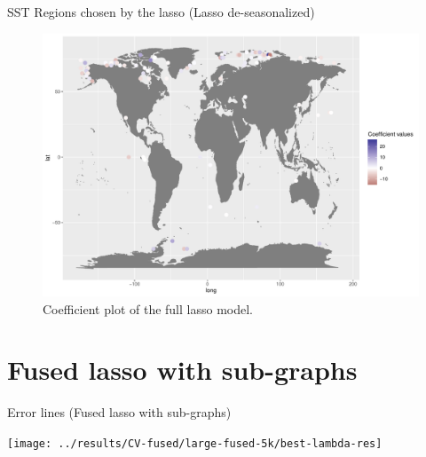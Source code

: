 \documentclass[
  ignorenonframetext,
]{beamer}
\begin{document}
\begin{frame}{SST Regions chosen by the lasso (Lasso de-seasonalized)}
\protect\hypertarget{sst-regions-chosen-by-the-lasso-lasso-de-seasonalized}{}
\begin{figure}

{\centering \includegraphics[width=0.75\linewidth]{ma-presentation_files/figure-beamer/coef-plot-full-lasso-des-1} 

}

\caption{Coefficient plot of the full lasso model.}\label{fig:coef-plot-full-lasso-des}
\end{figure}
\end{frame}

\hypertarget{fused-lasso-with-sub-graphs}{%
\section{Fused lasso with
sub-graphs}\label{fused-lasso-with-sub-graphs}}

\begin{frame}{Error lines (Fused lasso with sub-graphs)}
\protect\hypertarget{error-lines-fused-lasso-with-sub-graphs}{}
\begin{center}\texttt{[image: ../results/CV-fused/large-fused-5k/best-lambda-res]} \end{center}
\end{frame}
\end{document}
